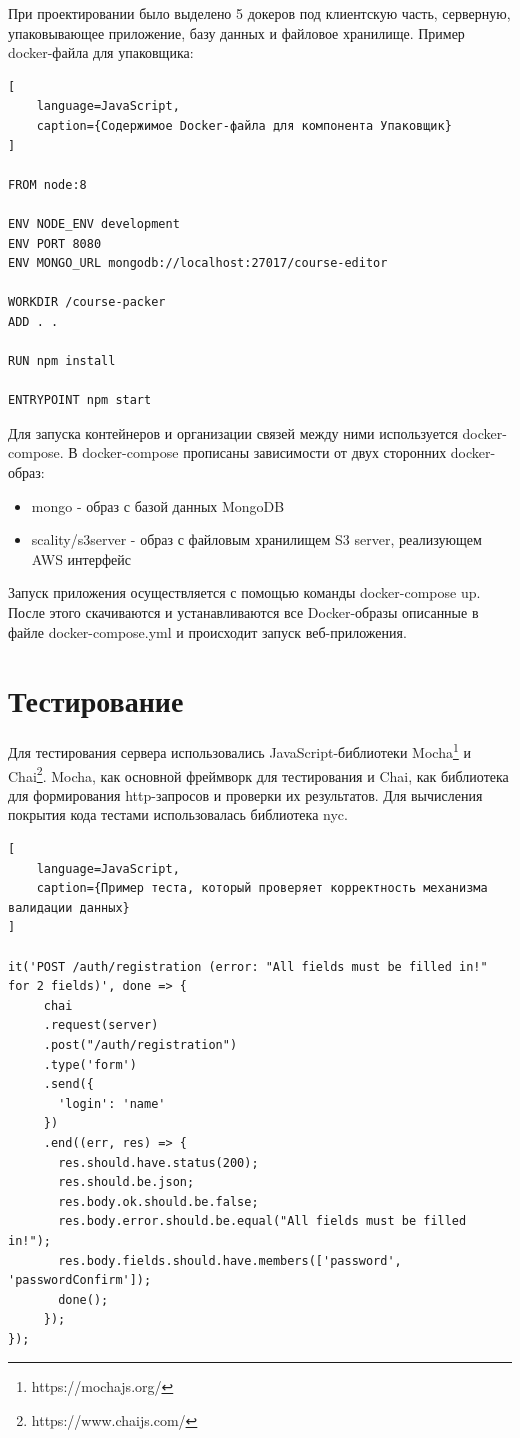 \documentclass[%
  a5paper,
  subf,
  href,
  master,
  dotsinheaders 
]{csse-fcs}
\begin{document}
При проектировании было выделено 5 докеров под клиентскую часть, серверную, упаковывающее приложение, базу данных и файловое хранилище.
Пример docker-файла для упаковщика:


\begin{lstlisting}[
    language=JavaScript,
    caption={Содержимое Docker-файла для компонента Упаковщик}
]

FROM node:8

ENV NODE_ENV development
ENV PORT 8080
ENV MONGO_URL mongodb://localhost:27017/course-editor

WORKDIR /course-packer
ADD . .

RUN npm install

ENTRYPOINT npm start

\end{lstlisting}

Для запуска контейнеров и организации связей между ними используется docker-compose. В docker-compose прописаны зависимости от двух сторонних docker-образ:

\begin{itemize}
	\item mongo - образ с базой данных MongoDB
	\item scality/s3server - образ с файловым хранилищем S3 server, реализующем AWS интерфейс 
\end{itemize}

Запуск приложения осуществляется с помощью команды docker-compose up. После этого скачиваются и устанавливаются все Docker-образы описанные в файле docker-compose.yml и происходит запуск веб-приложения. 

\section{Тестирование}

Для тестирования сервера использовались JavaScript-библиотеки Mocha\footnote{https://mochajs.org/} и Chai\footnote{https://www.chaijs.com/}. Mocha, как основной фреймворк для тестирования и Chai, как библиотека для формирования http-запросов и проверки их результатов. Для вычисления покрытия кода тестами использовалась библиотека nyc.

\begin{lstlisting}[
    language=JavaScript,
    caption={Пример теста, который проверяет корректность механизма валидации данных}
]

it('POST /auth/registration (error: "All fields must be filled in!" for 2 fields)', done => {
     chai
     .request(server)
     .post("/auth/registration")
     .type('form')
     .send({
       'login': 'name'
     })
     .end((err, res) => {
       res.should.have.status(200);
       res.should.be.json;
       res.body.ok.should.be.false;
       res.body.error.should.be.equal("All fields must be filled in!");
       res.body.fields.should.have.members(['password', 'passwordConfirm']);
       done();
     });
});
\end{lstlisting}
\end{document}
